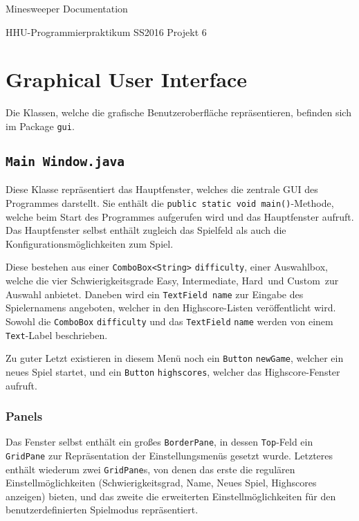 \documentclass[oneside,12pt]{scrartcl}
\newcommand*{\EnableHyphenationInTexttt}{\hyphenchar\font=45\relax}%
\newcommand{\class}[1]{\textcolor{Green4}{\bcode{#1}}}
\newcommand{\package}[1]{Package \npackage{#1}}
\newcommand{\npackage}[1]{\textcolor{Blue4}{\bcode{#1}}}
\newcommand{\method}[1]{\textcolor{Orange3}{\bcode{#1()}}}
\newcommand{\attribute}[1]{\textcolor{SkyBlue3}{\bcode{#1}}}
\newcommand{\classattribute}[2]{\class{#1} \attribute{#2}}
\newcommand{\bcode}[1]{\texttt{\EnableHyphenationInTexttt#1}}
\begin{document}
\setlength{\parindent}{0pt} %
\setlength{\parskip}{5pt}
\cofoot{}
\rofoot{\pagemark}

\begin{center}
\Huge{Minesweeper Documentation} \par
\Large{HHU-Programmierpraktikum SS2016 Projekt 6}
\end{center}

\tableofcontents

\section{Graphical User Interface}
Die Klassen, welche die grafische Benutzeroberfläche repräsentieren, befinden sich im \package{gui}.

\subsection{\class{Main Window.java}}
Diese Klasse repräsentiert das \glqq Hauptfenster\grqq, welches die zentrale GUI des Programmes darstellt. Sie enthält die \method{public static void main}-Methode, welche beim Start des Programmes aufgerufen wird und das Hauptfenster aufruft. Das Hauptfenster selbst enthält zugleich das Spielfeld als auch die Konfigurationsmöglichkeiten zum Spiel.

Diese bestehen aus einer \classattribute{ComboBox<String>}{difficulty}, einer Auswahlbox, welche die vier Schwierigkeitsgrade \glqq Easy\grqq, \glqq Intermediate\grqq, \glqq Hard\grqq\ und \glqq Custom\grqq\ zur Auswahl anbietet. Daneben wird ein \attribute{TextField name} zur Eingabe des Spielernamens angeboten, welcher in den Highscore-Listen veröffentlicht wird. Sowohl die \classattribute{ComboBox}{difficulty} und das \classattribute{TextField}{name} werden von einem \attribute{Text}-Label beschrieben.

Zu guter Letzt existieren in diesem Menü noch ein \classattribute{Button}{newGame}, welcher ein neues Spiel startet, und ein \classattribute{Button}{highscores}, welcher das Highscore-Fenster aufruft.

\subsubsection{Panels}
Das Fenster selbst enthält ein großes \class{BorderPane}, in dessen \attribute{Top}-Feld ein \class{GridPane} zur Repräsentation der Einstellungsmenüs gesetzt wurde. Letzteres enthält wiederum zwei \class{GridPane}s, von denen das erste die regulären Einstellmöglichkeiten (Schwierigkeitsgrad, Name, Neues Spiel, Highscores anzeigen) bieten, und das zweite die erweiterten Einstellmöglichkeiten für den benutzerdefinierten Spielmodus repräsentiert.
\end{document}
